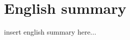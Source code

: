 \graphicspath{{chapt_dutch/}{chapt2/}{chapt3/}{chapt4/}}
\renewcommand{\thesection}{\arabic{section}}    %

\renewcommand{\bibname}{References}
\renewcommand\evenpagerightmark{{\scshape\small English summary}}
\renewcommand\oddpageleftmark{{\scshape\small English summary}}

\chapter[English summary]%
{English summary}

\hyphenation{}

insert english summary here...

\clearpage




\clearpage{\pagestyle{empty}\cleardoublepage}

\renewcommand*{\thesection}{\thechapter.\arabic{section}}       %


